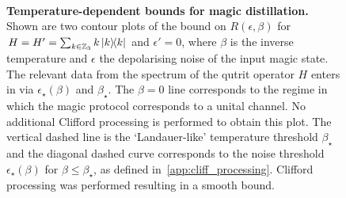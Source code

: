 \documentclass[pra,
aps,
twocolumn,
superscriptaddress,
groupedaddress,
nofootinbib,
reprint
]{revtex4-1}
\begin{document}
\begin{figure}[t!]
    \centering
    \\
    \caption{\textbf{Temperature-dependent bounds for magic distillation.}  Shown are two contour plots of the bound on $R(\epsilon, \beta)$ for $H = H' = \sum_{k \in \mathbb{Z}_3} k \ketbra{k}$ and $\epsilon' = 0$, where $\beta$ is the inverse temperature and $\epsilon$ the depolarising noise of the input magic state. The relevant data from the spectrum of the qutrit operator $H$ enters in via $\epsilon_\star(\beta)$ and $\beta_\star$. The $\beta = 0$ line corresponds to the regime in which the magic protocol corresponds to a unital channel.
 No additional Clifford processing is performed to obtain this plot. The vertical dashed line is the `Landauer-like' temperature threshold $\beta_\star$ and the diagonal dashed curve corresponds to the noise threshold $\epsilon_\star(\beta)$ for $\beta \leq \beta_\star$, as defined in~\cref{app:cliff_processing}.
  Clifford processing was performed resulting in a smooth bound.}
    \label{fig:rate_contour}
\end{figure}
\end{document}
